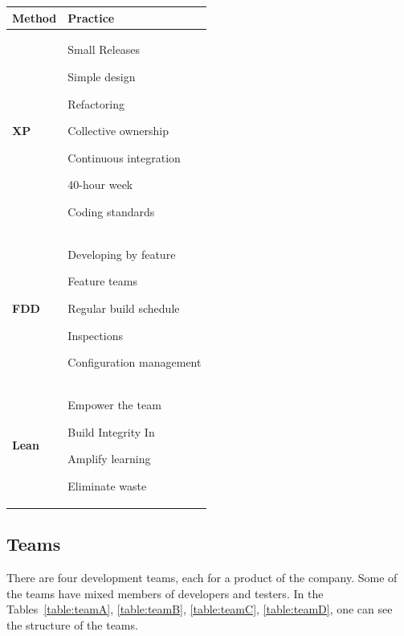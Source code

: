 \begin{tabular}{| p{2cm} | p{13cm}|}
    \hline
     \textbf{Method} & \textbf{Practice} \\ \hline
     \textbf{XP}  & \begin{inparaenum} [a\upshape)]
     				\item Small Releases \item Simple design \item Refactoring \item Collective ownership \item Continuous integration \item 40-hour week \item Coding standards
					\end{inparaenum}      \\ \hline
     \textbf{FDD}  & \begin{inparaenum} [a\upshape)]  \item Developing by feature \item Feature teams \item Regular build schedule \item Inspections \item Configuration management
     				  \end{inparaenum}\\ \hline
     \textbf{Lean} & \begin{inparaenum} [a\upshape)] \item Empower the team \item Build Integrity In \item Amplify learning \item Eliminate waste
     				 \end{inparaenum} \\ \hline
\end{tabular}


\subsection{Teams}
There are four development teams, each for a product of the company. Some of the teams have mixed members of developers and testers. In the Tables~\ref{table:teamA}, \ref{table:teamB}, \ref{table:teamC}, \ref{table:teamD}, one can see the structure of the teams. \\

